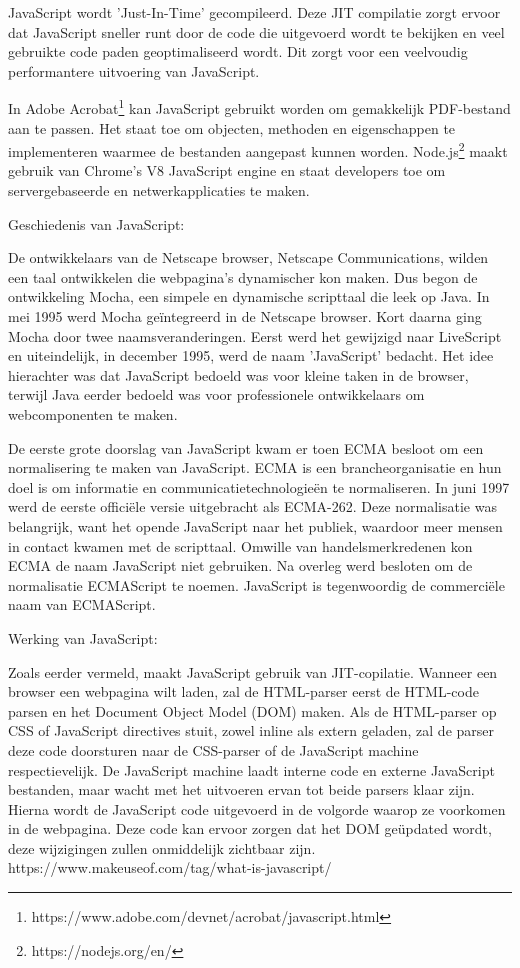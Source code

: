 JavaScript wordt 'Just-In-Time' gecompileerd. Deze JIT compilatie zorgt ervoor dat JavaScript sneller runt door de code die uitgevoerd wordt te bekijken en veel gebruikte code paden geoptimaliseerd wordt. Dit zorgt voor een veelvoudig performantere uitvoering van JavaScript. \autocite{Clark2017}

In Adobe Acrobat\footnote{https://www.adobe.com/devnet/acrobat/javascript.html} kan JavaScript gebruikt worden om gemakkelijk PDF-bestand aan te passen. Het staat toe om objecten, methoden en eigenschappen te implementeren waarmee de bestanden aangepast kunnen worden. Node.js\footnote{https://nodejs.org/en/} maakt gebruik van Chrome's V8 JavaScript engine en staat developers toe om servergebaseerde en netwerkapplicaties te maken.

Geschiedenis van JavaScript:

De ontwikkelaars van de Netscape browser, Netscape Communications, wilden een taal ontwikkelen die webpagina's dynamischer kon maken. Dus begon de ontwikkeling Mocha, een simpele en dynamische scripttaal die leek op Java. In mei 1995 werd Mocha geïntegreerd in de Netscape browser. Kort daarna ging Mocha door twee naamsveranderingen. Eerst werd het gewijzigd naar LiveScript en uiteindelijk, in december 1995, werd de naam 'JavaScript' bedacht. Het idee hierachter was dat JavaScript bedoeld was voor kleine taken in de browser, terwijl Java eerder bedoeld was voor professionele ontwikkelaars om webcomponenten te maken. \autocite{Peyrott2017}

De eerste grote doorslag van JavaScript kwam er toen ECMA besloot om een normalisering te maken van JavaScript. ECMA is een brancheorganisatie en hun doel is om informatie en communicatietechnologieën te normaliseren. In juni 1997 werd de eerste officiële versie uitgebracht als ECMA-262. Deze normalisatie was belangrijk, want het opende JavaScript naar het publiek, waardoor meer mensen in contact kwamen met de scripttaal. Omwille van handelsmerkredenen kon ECMA de naam JavaScript niet gebruiken. Na overleg werd besloten om de normalisatie ECMAScript te noemen. JavaScript is tegenwoordig de commerciële naam van ECMAScript.\autocite{Peyrott2017}

Werking van JavaScript:

Zoals eerder vermeld, maakt JavaScript gebruik van JIT-copilatie. Wanneer een browser een webpagina wilt laden, zal de HTML-parser eerst de HTML-code parsen en het Document Object Model (DOM) maken. Als de HTML-parser op CSS of JavaScript directives stuit, zowel inline als extern geladen, zal de parser deze code doorsturen naar de CSS-parser of de JavaScript machine respectievelijk. De JavaScript machine laadt interne code en externe JavaScript bestanden, maar wacht met het uitvoeren ervan tot beide parsers klaar zijn. Hierna wordt de JavaScript code uitgevoerd in de volgorde waarop ze voorkomen in de webpagina. Deze code kan ervoor zorgen dat het DOM geüpdated wordt, deze wijzigingen zullen onmiddelijk zichtbaar zijn. https://www.makeuseof.com/tag/what-is-javascript/

